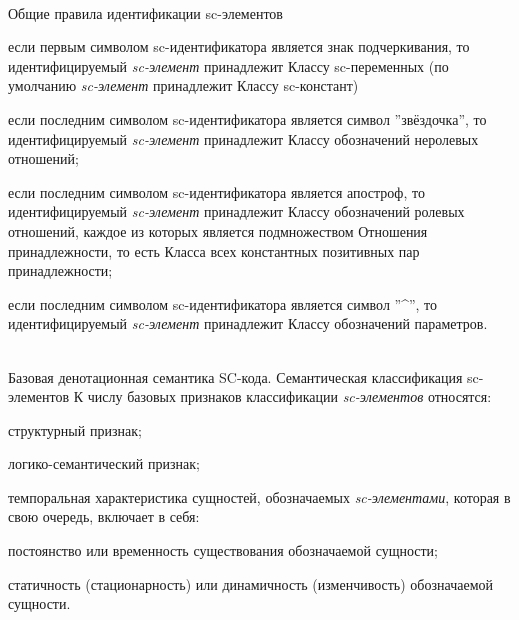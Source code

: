 \begin{frame}{\\Общие правила идентификации sc-элементов}
	\vspace{10mm}
	\begin{SCn}
		\begin{textitemize}
			\item если первым символом sc-идентификатора является знак подчеркивания, то идентифицируемый \textit{sc-элемент} принадлежит Классу sc-переменных (по умолчанию \textit{sc-элемент} принадлежит Классу sc-констант)
			\item если последним символом sc-идентификатора является символ ''звёздочка'', то идентифицируемый \textit{sc-элемент} принадлежит Классу обозначений неролевых отношений;
			\item если последним символом sc-идентификатора является апостроф, то идентифицируемый \textit{sc-элемент} принадлежит Классу обозначений ролевых отношений, каждое из которых является подмножеством Отношения принадлежности, то есть Класса всех константных позитивных пар принадлежности;
			\item если последним символом sc-идентификатора является символ ''\textasciicircum'', то идентифицируемый \textit{sc-элемент} принадлежит Классу обозначений параметров.
		\end{textitemize}
	\end{SCn}
\end{frame}

\begin{frame}{\\Базовая денотационная семантика SC-кода. Семантическая классификация sc-элементов}
	К числу базовых признаков классификации \textit{sc-элементов} относятся:
	\begin{textitemize}
		\item структурный признак;
		\item логико-семантический признак;
		\item темпоральная характеристика сущностей, обозначаемых \textit{sc-элементами}, которая в свою очередь, включает в себя:
		\begin{textitemize}
			\item постоянство или временность существования обозначаемой сущности;
			\item статичность (стационарность) или динамичность (изменчивость) обозначаемой сущности.
		\end{textitemize}
	\end{textitemize}
\end{frame}

